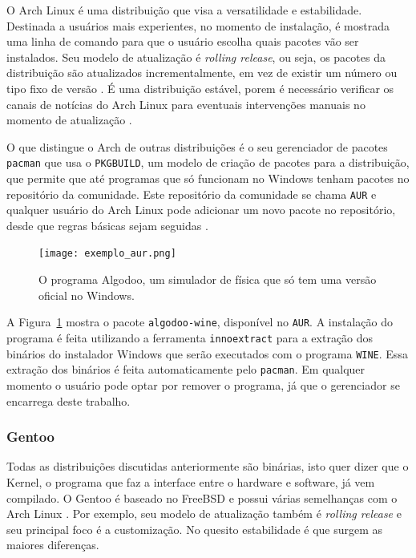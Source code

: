 \documentclass[
article,			%
12pt,				%
openright,			%
oneside,			%
a4paper,			%
chapter=TITLE,		%
section=TITLE,		%
subsection=TITLE,	%
subsubsection=TITLE,%
subsubsubsection=TITLE, %
english,			%
brazil,				%
]{abntex2}
\def\code#1{\texttt{#1}}
\begin{document}
O Arch Linux é uma distribuição que visa a versatilidade e
estabilidade. Destinada a usuários mais experientes, no momento de
instalação, é mostrada uma linha de comando para que o usuário escolha
quais pacotes vão ser instalados. Seu modelo de atualização é
\emph{rolling release}, ou seja, os pacotes da distribuição são
atualizados incrementalmente, em vez de existir um número ou tipo fixo
de versão \cite{ArchWiki2018a}. É uma distribuição estável, porem é
necessário verificar os canais de notícias do Arch Linux para
eventuais intervenções manuais no momento de atualização
\cite{ArchWiki2018c}.

O que distingue o Arch de outras distribuições é o seu gerenciador de
pacotes \code{pacman} que usa o \code{PKGBUILD}, um modelo de criação
de pacotes para a distribuição, que permite que até programas que só
funcionam no Windows tenham pacotes no repositório da comunidade. Este
repositório da comunidade se chama \code{AUR} e qualquer usuário do
Arch Linux pode adicionar um novo pacote no repositório, desde que
regras básicas sejam seguidas \cite{ArchWiki2018d}.

\begin{figure}[H]
    \caption{\label{fig:exemplo-aur}O programa Algodoo, um simulador
    de física que só tem uma versão oficial no Windows.}
    \begin{center}
        \texttt{[image: exemplo\_aur.png]}
    \end{center}
\end{figure}

A Figura~\ref{fig:exemplo-aur} mostra o pacote \code{algodoo-wine},
disponível no \code{AUR}. A instalação do programa é feita utilizando
a ferramenta \code{innoextract} para a extração dos binários do
instalador Windows que serão executados com o programa \code{WINE}.
Essa extração dos binários é feita automaticamente pelo \code{pacman}.
Em qualquer momento o usuário pode optar por remover o programa, já
que o gerenciador se encarrega deste trabalho.

\subsubsection{Gentoo}

Todas as distribuições discutidas anteriormente são binárias, isto
quer dizer que o Kernel, o programa que faz a interface entre o
hardware e software, já vem compilado. O Gentoo é baseado no FreeBSD e
possui várias semelhanças com o Arch Linux \cite{GentooFundation2018}.
Por exemplo, seu modelo de atualização também é \emph{rolling release}
e seu principal foco é a customização. No quesito estabilidade é que
surgem as maiores diferenças.
\end{document}
